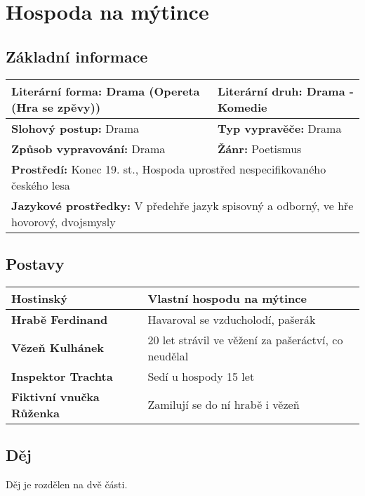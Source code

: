 \section{Hospoda na mýtince}
\label{sec:hospodanamytince}
\subsection*{Základní informace}
\begin{tabularx}{\linewidth}{l|l}
  \textbf{Literární forma:} Drama (Opereta (Hra se zpěvy)) & \textbf{Literární druh:} Drama - Komedie                \\
  \hline
  \textbf{Slohový postup:} Drama                           & \textbf{Typ vypravěče:} Drama                           \\
  \hline
  \textbf{Způsob vypravování:} Drama                       & \textbf{Žánr:} Poetismus                                \\
  \hline
  \multicolumn{2}{l}{\textbf{Prostředí:} Konec 19. st., Hospoda uprostřed nespecifikovaného českého lesa}            \\
  \hline
  \multicolumn{2}{l}{\textbf{Jazykové prostředky:} V předehře jazyk spisovný a odborný, ve hře hovorový, dvojsmysly} \\
\end{tabularx}
\subsection*{Postavy}
\begin{tabularx}{\linewidth}{l|l}
  \textbf{Hostinský}               & Vlastní hospodu na mýtince                          \\
  \hline
  \textbf{Hrabě Ferdinand}         & Havaroval se vzducholodí, pašerák                   \\
  \hline
  \textbf{Vězeň Kulhánek}          & 20 let strávil ve věžení za pašeráctví, co neudělal \\
  \hline
  \textbf{Inspektor Trachta}       & Sedí u hospody 15 let                               \\
  \hline
  \textbf{Fiktivní vnučka Růženka} & Zamilují se do ní hrabě i vězeň                     \\
\end{tabularx}
\subsection*{Děj}
Děj je rozdělen na dvě části.


